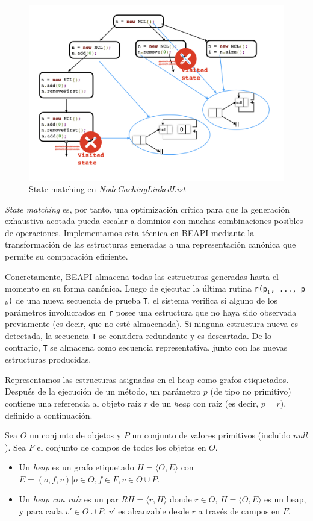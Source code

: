 \begin{figure}[H]
  \centering
  \includegraphics[width=1\textwidth]{images/stateMatching1.jpg}
  \caption{State matching en \emph{NodeCachingLinkedList}}
  \label{fig:stateMatching}
\end{figure}


\emph{State matching} es, por tanto, una optimización crítica para que la generación exhaustiva acotada pueda escalar a dominios con muchas combinaciones posibles de operaciones. 
Implementamos esta técnica en \textsf{BEAPI} mediante la transformación de las estructuras generadas a una representación canónica que permite su comparación eficiente.

Concretamente, \textsf{BEAPI} almacena todas las estructuras generadas hasta el momento en su forma canónica. 
Luego de ejecutar la última rutina \texttt{r(p$_1$, ..., p$_k$)} de una nueva secuencia de prueba \texttt{T}, 
el sistema verifica si alguno de los parámetros involucrados en \texttt{r} posee una estructura que no haya sido observada previamente (es decir, que no esté almacenada). 
Si ninguna estructura nueva es detectada, la secuencia \texttt{T} se considera redundante y es descartada. 
De lo contrario, \texttt{T} se almacena como secuencia representativa, junto con las nuevas estructuras producidas.

Representamos las estructuras asignadas en el heap como grafos etiquetados. 
Después de la ejecución de un método, un parámetro $p$ (de tipo no primitivo) 
contiene una referencia al objeto raíz $r$ de un \emph{heap} con raíz (es decir, $p=r$), definido a continuación.

\begin{definition}
Sea $O$ un conjunto de objetos y $P$ un conjunto de valores primitivos (incluido $null$). Sea $F$ el conjunto de campos de todos los objetos en $O$.
\begin{itemize}
\item Un \emph{heap} es un grafo etiquetado $H = \langle O, E\rangle$ con $E = {(o, f, v) | o \in O, f \in F, v \in O \cup P}$.
\item Un \emph{heap con raíz} es un par $RH = \langle r, H \rangle$ donde $r \in O$, $H = \langle O, E\rangle$ es un heap, y para cada $v' \in O \cup P$, $v'$ es alcanzable desde $r$ a través de campos en $F$.
\end{itemize}
\end{definition}

